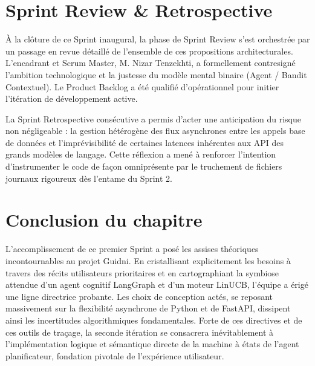 \section{Sprint Review \& Retrospective}

À la clôture de ce Sprint inaugural, la phase de Sprint Review s'est orchestrée par un passage en revue détaillé de l'ensemble de ces propositions architecturales. L'encadrant et Scrum Master, M. Nizar Tenzekhti, a formellement contresigné l'ambition technologique et la justesse du modèle mental binaire (Agent / Bandit Contextuel). Le Product Backlog a été qualifié d'opérationnel pour initier l'itération de développement active. 

La Sprint Retrospective consécutive a permis d'acter une anticipation du risque non négligeable : la gestion hétérogène des flux asynchrones entre les appels base de données et l'imprévisibilité de certaines latences inhérentes aux API des grands modèles de langage. Cette réflexion a mené à renforcer l'intention d'instrumenter le code de façon omniprésente par le truchement de fichiers journaux rigoureux dès l'entame du Sprint 2.

\section*{Conclusion du chapitre}

L'accomplissement de ce premier Sprint a posé les assises théoriques incontournables au projet Guidni. En cristallisant explicitement les besoins à travers des récits utilisateurs prioritaires et en cartographiant la symbiose attendue d'un agent cognitif LangGraph et d'un moteur LinUCB, l'équipe a érigé une ligne directrice probante. Les choix de conception actés, se reposant massivement sur la flexibilité asynchrone de Python et de FastAPI, dissipent ainsi les incertitudes algorithmiques fondamentales. Forte de ces directives et de ces outils de traçage, la seconde itération se consacrera inévitablement à l'implémentation logique et sémantique directe de la machine à états de l'agent planificateur, fondation pivotale de l'expérience utilisateur.
